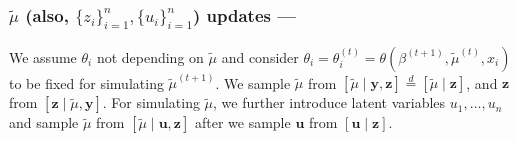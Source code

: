 \documentclass[10pt, oneside]{article}   	%
\renewcommand{\th}{\theta}
\begin{document}
\subsubsection[]{$\widetilde \mu$ (also, $\{z_i\}_{i=1}^n, \{u_i\}_{i=1}^n$) updates ---} 
We assume $\th_i$ not depending on $\widetilde \mu$ and consider $\th_i = \th^{(t)}_i = \th(\beta^{(t+1)}, {\widetilde{\mu}}^{(t)}, x_i)$ to be fixed for simulating ${\widetilde \mu}^{(t+1)}$. 
We sample $\widetilde \mu$ from $[\widetilde \mu \mid \mathbf{y}, \mathbf{z}] \stackrel{d}{=}  [\widetilde \mu \mid \mathbf{z}]$, and $\mathbf{z}$ from $[\mathbf{z} \mid \widetilde \mu, \mathbf{y}]$. For simulating $\widetilde \mu$, we further introduce latent variables $u_1, \dots, u_n$ and sample $\widetilde \mu$ from $[\widetilde \mu \mid \mathbf{u}, \mathbf{z}]$ after we sample $\mathbf{u}$ from $[\mathbf{u} \mid \mathbf{z}]$.
\end{document}
